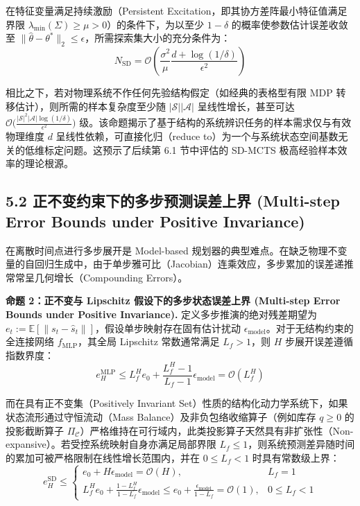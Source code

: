 \documentclass[UTF8]{ctexart}
\begin{document}
在特征变量满足持续激励（Persistent Excitation，即其协方差阵最小特征值满足界限 $\lambda_{\text{min}}(\Sigma) \ge \mu > 0$）的条件下，为以至少 $1-\delta$ 的概率使参数估计误差收敛至 $\|\hat{\theta} - \theta^*\|_2 \le \epsilon$，所需探索集大小的充分条件为：
\[ N_{\text{SD}} = \mathcal{O}\left( \frac{\sigma^2}{\mu} \frac{d + \log(1/\delta)}{\epsilon^2} \right) \]

相比之下，若对物理系统不作任何先验结构假定（如经典的表格型有限 MDP 转移估计），则所需的样本复杂度至少随 \(|\mathcal{S}||\mathcal{A}|\) 呈线性增长，甚至可达
\(\mathcal{O}\big( \frac{|\mathcal{S}|^2|\mathcal{A}| \log(1/\delta)}{\epsilon^2} \big)\) 级。该命题揭示了基于结构的系统辨识任务的样本需求仅与有效物理维度 \(d\) 呈线性依赖，可直接化归（reduce to）为一个与系统状态空间基数无关的低维标定问题。这预示了后续第 6.1 节中评估的 SD-MCTS 极高经验样本效率的理论根源。

\hypertarget{ux6291ux5236-ood-ux6563ux9038ux4eceux6307ux6570ux7ea7ux590dux5408ux8befux5deeux5230ux5b88ux6052ux754cux5ea6-bounding-compounding-errors-via-conservation}{%
\subsection{5.2 正不变约束下的多步预测误差上界 (Multi-step Error Bounds under Positive Invariance)}\label{ux6291ux5236-ood-ux6563ux9038ux4eceux6307ux6570ux7ea7ux590dux5408ux8befux5deeux5230ux5b88ux6052ux754cux5ea6-bounding-compounding-errors-via-conservation}}

在离散时间点进行多步展开是 Model-based
规划器的典型难点。在缺乏物理不变量的自回归生成中，由于单步雅可比（Jacobian）连乘效应，多步累加的误差递推常常呈几何增长（Compounding
Errors）。

\textbf{命题 2：正不变与 Lipschitz 假设下的多步状态误差上界 (Multi-step Error Bounds under Positive Invariance). }
定义多步推演的绝对残差期望为 \( e_t := \mathbb{E}[\|s_t - \hat{s}_t\|] \)，假设单步映射存在固有估计扰动 \(\epsilon_{\text{model}}\)。对于无结构约束的全连接网络
\(f_{\text{MLP}}\)，其全局 Lipschitz 常数通常满足 \(L_f > 1\)，则 \(H\)
步展开误差遵循指数界度：
\[ e_H^{\text{MLP}} \le L_f^H e_0 + \frac{L_f^H - 1}{L_f - 1} \epsilon_{\text{model}} = \mathcal{O}(L_f^H) \]

而在具有正不变集（Positively Invariant Set）性质的结构化动力学系统下，如果状态流形通过守恒流动（Mass
Balance）及非负包络收缩算子（例如库存 \(q \ge 0\) 的投影截断算子
\(\Pi_{\mathcal{C}}\)）严格维持在可行域内，此类投影算子天然具有非扩张性（Non-expansive）。若受控系统映射自身亦满足局部界限 \(L_f \le 1\)，则系统预测差异随时间的累加可被严格限制在线性增长范围内，并在 \(0 \le L_f < 1\) 时具有常数级上界：
\[
e_H^{\text{SD}} \le 
\begin{cases}
e_0 + H\epsilon_{\text{model}} = \mathcal{O}(H), & L_f = 1 \\
L_f^H e_0 + \frac{1 - L_f^H}{1 - L_f} \epsilon_{\text{model}} \le e_0 + \frac{\epsilon_{\text{model}}}{1 - L_f} = \mathcal{O}(1), & 0 \le L_f < 1
\end{cases}
\]
\end{document}
